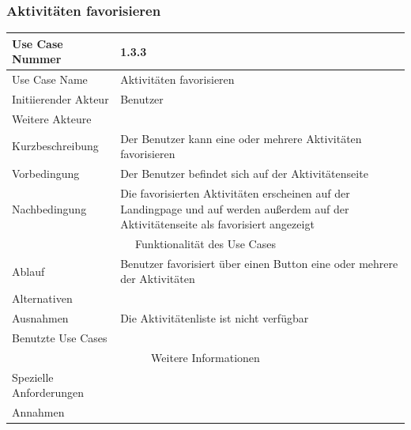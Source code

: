 \documentclass[10pt,a4paper]{article}
\begin{document}
	\subsubsection{Aktivit\"aten favorisieren}
	\begin{tabularx}{\textwidth}{|l|X|}
	\hline Use Case Nummer & 1.3.3 \\ 
	\hline Use Case Name & Aktivit\"aten favorisieren \\ 
	\hline Initiierender Akteur & Benutzer \\
	\hline Weitere Akteure & \\
	\hline Kurzbeschreibung & Der Benutzer kann eine oder mehrere Aktivit\"aten favorisieren \\
	\hline Vorbedingung & Der Benutzer befindet sich auf der Aktivit\"atenseite \\
	\hline Nachbedingung & Die favorisierten Aktivit\"aten erscheinen auf der Landingpage und auf werden außerdem auf der Aktivit\"atenseite als favorisiert angezeigt \\
	\hline \multicolumn{2}{|c|}{Funktionalität des Use Cases}\\
	\hline Ablauf & Benutzer favorisiert über einen Button eine oder mehrere der Aktivit\"aten \\
	\hline Alternativen & \\
	\hline Ausnahmen & Die Aktivit\"atenliste ist nicht verf\"ugbar \\
	\hline Benutzte Use Cases & \\
	\hline \multicolumn{2}{|c|}{Weitere Informationen} \\
	\hline Spezielle Anforderungen & \\
	\hline Annahmen & \\
	\hline
	\end{tabularx} 
\end{document}
